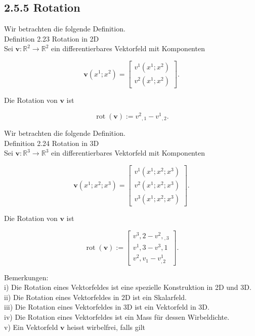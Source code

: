 \documentclass[10pt]{article}
\begin{document}
\subsection*{2.5.5 Rotation}
Wir betrachten die folgende Definition.\\
Definition 2.23 Rotation in 2D\\
Sei $\mathbf{v}: \mathbb{R}^{2} \rightarrow \mathbb{R}^{2}$ ein differentierbares Vektorfeld mit Komponenten

\[
\mathbf{v}\left(x^{1} ; x^{2}\right)=\left[\begin{array}{c}
v^{1}\left(x^{1} ; x^{2}\right)  \tag{2.154}\\
v^{2}\left(x^{1} ; x^{2}\right)
\end{array}\right] .
\]

Die Rotation von $\mathbf{v}$ ist


\begin{equation*}
\operatorname{rot}(\mathbf{v}):=v^{2}{ }_{, 1}-v^{1}{ }_{, 2} . \tag{2.155}
\end{equation*}


Wir betrachten die folgende Definition.\\
Definition 2.24 Rotation in 3D\\
Sei $\mathbf{v}: \mathbb{R}^{3} \rightarrow \mathbb{R}^{3}$ ein differentierbares Vektorfeld mit Komponenten

\[
\mathbf{v}\left(x^{1} ; x^{2} ; x^{3}\right)=\left[\begin{array}{c}
v^{1}\left(x^{1} ; x^{2} ; x^{3}\right)  \tag{2.156}\\
v^{2}\left(x^{1} ; x^{2} ; x^{3}\right) \\
v^{3}\left(x^{1} ; x^{2} ; x^{3}\right)
\end{array}\right] .
\]

Die Rotation von $\mathbf{v}$ ist

\[
\operatorname{rot}(\mathbf{v}):=\left[\begin{array}{c}
v^{3}, 2-v^{2},{ }_{, 3}  \tag{2.157}\\
v^{1}, 3-v^{3}, 1 \\
v^{2}, v_{1}-v_{, 2}^{1}
\end{array}\right] .
\]

Bemerkungen:\\
i) Die Rotation eines Vektorfeldes ist eine spezielle Konstruktion in 2D und 3D.\\
ii) Die Rotation eines Vektorfeldes in 2D ist ein Skalarfeld.\\
iii) Die Rotation eines Vektorfeldes in 3D ist ein Vektorfeld in 3D.\\
iv) Die Rotation eines Vektorfeldes ist ein Mass für dessen Wirbeldichte.\\
v) Ein Vektorfeld $\mathbf{v}$ heisst wirbelfrei, falls gilt
\end{document}
